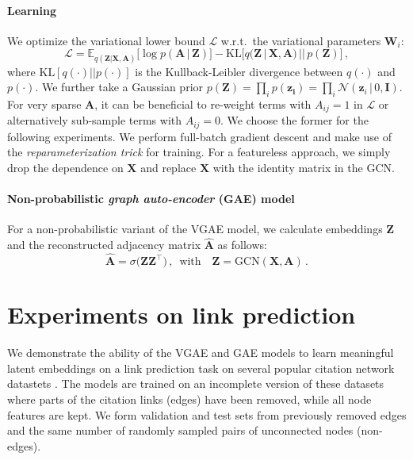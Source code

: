 \documentclass{article}
\begin{document}
\paragraph{Learning}
We optimize the variational lower bound $\mathcal{L}$ w.r.t.~the variational parameters $\mathbf{W}_i$:
\begin{equation}
\mathcal{L} =  \mathbb{E}_{q(\mathbf{Z}|\mathbf{X},\mathbf{A})}\bigl[\log p\left(\mathbf{A}\,|\,\mathbf{Z}\right)\bigr]
 - \mathrm{KL}\bigl[q(\mathbf{Z}\,|\,\mathbf{X},\mathbf{A})\,||\,p(\mathbf{Z})\bigr]\, ,
\end{equation}
where $\mathrm{KL}[q(\cdot)||p(\cdot)]$ is the Kullback-Leibler divergence between $q(\cdot)$ and $p(\cdot)$. We further take a Gaussian prior $p(\mathbf{Z}) = \prod_i p(\mathbf{z_i}) = \prod_i \mathcal{N}(\mathbf{z}_i\,|\, 0, \mathbf{I})$. For very sparse $\mathbf{A}$, it can be beneficial to re-weight terms with $A_{ij}=1$ in $\mathcal{L}$ or alternatively sub-sample terms with $A_{ij}=0$. We choose the former for the following experiments. We perform full-batch gradient descent and make use of the \emph{reparameterization trick} \cite{kingma2013auto} for training. For a featureless approach, we simply drop the dependence on $\mathbf{X}$ and replace $\mathbf{X}$ with the identity matrix in the GCN. 

\paragraph{Non-probabilistic \emph{graph auto-encoder} (GAE) model}
For a non-probabilistic variant of the VGAE model, we calculate embeddings $\mathbf{Z}$ and the reconstructed adjacency matrix $\mathbf{\hat{A}}$ as follows:
\begin{equation}
\mathbf{\hat{A}} = \sigma\bigl(\mathbf{Z} \mathbf{Z}^\top\bigr) \, , \,\,\,  \text{with} \quad \mathbf{Z} = \mathrm{GCN}(\mathbf{X}, \mathbf{A}) \, .
\label{eq:gae}
\end{equation}

\section{Experiments on link prediction}
We demonstrate the ability of the VGAE and GAE models to learn meaningful latent embeddings on a link prediction task on several popular citation network datastets \cite{aimag08}. The models are trained on an incomplete version of these datasets where parts of the citation links (edges) have been removed, while all node features are kept. We form validation and test sets from previously removed edges and the same number of randomly sampled pairs of unconnected nodes (non-edges).
\end{document}
